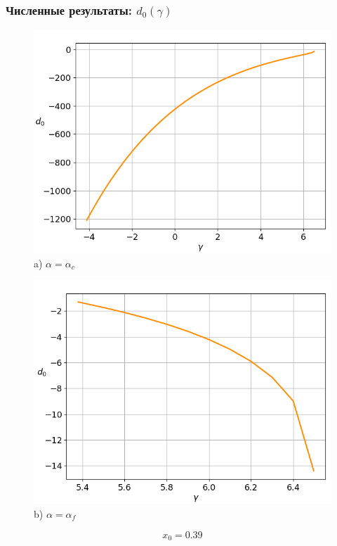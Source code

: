 \documentclass[fullscreen=true, unicode, bookmarks=false]{beamer}
\begin{document}
\begin{frame}
\frametitle{ Численные результаты: $ d_0(\gamma) $ }

\begin{figure} 
\begin{minipage}[h]{0.49\linewidth}
\begin{center}
\includegraphics[scale=0.32]{oscillating_d0_x0_039.png} \\ {\scriptsize a) $ \alpha = \alpha_c $}
\end{center}
\end{minipage} 
\hfill
\begin{minipage}[h]{0.49\linewidth}
\begin{center}
\includegraphics[scale=0.32]{oscillating_d0_after_tangent_x0_039.png}  \\ {\scriptsize b) $ \alpha = \alpha_f $}
\end{center}
\end{minipage} 
\end{figure}

$$ x_0 = 0.39 $$

\end{frame}
\end{document}
